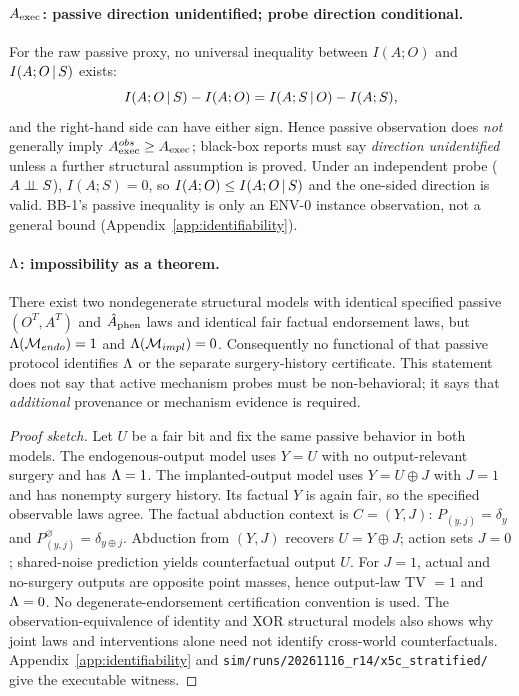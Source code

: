 \paragraph{$A_{\mathrm{exec}}$: passive direction unidentified; probe direction conditional.}
For the raw passive proxy, no universal inequality between
$I(A;O)$ and $I(A;O\,|\, S)$ exists:
\[
I(A;O\,|\, S)-I(A;O)=I(A;S\,|\, O)-I(A;S),
\]
and the right-hand side can have either sign. Hence passive observation does
\emph{not} generally imply $A_{\mathrm{exec}}^{obs}\ge A_{\mathrm{exec}}$; black-box reports must say
\emph{direction unidentified} unless a further structural assumption is
proved. Under an independent probe ($A\perp\!\!\!\perp S$), $I(A;S)=0$, so
$I(A;O)\le I(A;O\,|\, S)$ and the one-sided direction is valid. BB-1's
passive inequality is only an ENV-0 instance observation, not a general
bound (Appendix~\ref{app:identifiability}).

\paragraph{$\Lambda$: impossibility as a theorem.}

\begin{proposition}\label{prop:unidentifiable}
There exist two nondegenerate structural models with identical specified
passive $(O^T,A^T)$ and $\hat{A}_{\mathrm{phen}}$ laws and identical fair factual endorsement
laws, but $\Lambda(\mathcal M_{endo})=1$ and $\Lambda(\mathcal M_{impl})=0$.
Consequently no functional of that passive protocol identifies $\Lambda$ or the
separate surgery-history certificate. This statement does not say that active
mechanism probes must be non-behavioral; it says that \emph{additional}
provenance or mechanism evidence is required.
\end{proposition}
\begin{proof}[Proof sketch]
Let $U$ be a fair bit and fix the same passive behavior in both models. The
endogenous-output model uses $Y=U$ with no output-relevant surgery and has
$\Lambda=1$. The implanted-output model uses $Y=U\oplus J$ with $J=1$ and has
nonempty surgery history. Its factual $Y$ is again fair, so the specified
observable laws agree. The factual abduction context is $C=(Y,J)$:
$P_{(y,j)}=\delta_y$ and $P^{\varnothing}_{(y,j)}=\delta_{y\oplus j}$.
Abduction from $(Y,J)$ recovers $U=Y\oplus J$; action sets $J=0$;
shared-noise prediction yields counterfactual output $U$. For $J=1$, actual
and no-surgery outputs are opposite point masses, hence output-law TV $=1$ and
$\Lambda=0$. No degenerate-endorsement certification convention is used. The
observation-equivalence of identity and XOR structural models also shows why
joint laws and interventions alone need not identify cross-world
counterfactuals. Appendix~\ref{app:identifiability} and
\texttt{sim/runs/20261116\_r14/x5c\_stratified/} give the executable witness.
\end{proof}

